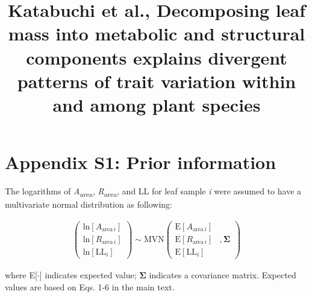 \documentclass[
  12pt,
  letterpaper,
  DIV=11,
  numbers=noendperiod]{scrartcl}
\title{Katabuchi et al., Decomposing leaf mass into metabolic and
structural components explains divergent patterns of trait variation
within and among plant species}
\author{}
\date{}
\begin{document}
\maketitle
\ifdefined\Shaded\renewenvironment{Shaded}{\begin{tcolorbox}[frame hidden, sharp corners, borderline west={3pt}{0pt}{shadecolor}, boxrule=0pt, breakable, interior hidden, enhanced]}{\end{tcolorbox}}\fi

\newpage

\hypertarget{appendix-s1-prior-information}{%
\section{Appendix S1: Prior
information}\label{appendix-s1-prior-information}}

The logarithms of \emph{A}\textsubscript{area},
\emph{R}\textsubscript{area}, and LL for leaf sample \emph{i} were
assumed to have a multivariate normal distribution as following:

\begin{align}
\left(
\begin{array}{ccc}
\mathrm{ln}[A_{\mathrm{area} \, i}]\\
\mathrm{ln}[R_{\mathrm{area} \, i}] \\
\mathrm{ln}[\mathrm{LL}_i]
\end{array}
\right)
\sim \mathrm{MVN}
\left(
\begin{array}{rrr}
\mathrm{E}[A_{\mathrm{area} \, i}]\\
\mathrm{E}[R_{\mathrm{area} \, i}] &, \boldsymbol{\Sigma}\\
\mathrm{E}[\mathrm{LL}_i]
\end{array}
\right) \tag{S1}
\end{align}

where E{[}\(\cdot\){]} indicates expected value; \(\boldsymbol{\Sigma}\)
indicates a covariance matrix. Expected values are based on Eqs. 1-6 in
the main text.
\end{document}
